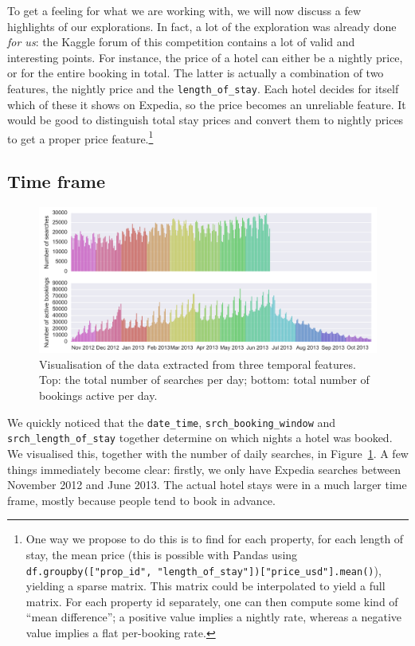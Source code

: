 \documentclass[runningheads,a4paper]{llncs}
\begin{document}
To get a feeling for what we are working with, we will now discuss a few highlights
of our explorations. In fact, a lot of the exploration was already done \emph{for us}: 
the Kaggle forum of this competition contains a lot of valid and interesting points.
For instance, the price of a hotel can either be a nightly price, or for the entire
booking in total. The latter is actually a combination of two features, the nightly price and the \verb|length_of_stay|. Each hotel decides for itself which of these it shows on Expedia, so the price becomes an unreliable feature. It would be good to distinguish total stay prices and convert them to nightly prices to get a proper price feature.\footnote{One way we propose to do this is to find for each property, for each length of stay, the mean price (this is possible with Pandas using \texttt{df.groupby(["prop\_id", "length\_of\_stay"])["price\_usd"].mean()}), yielding a sparse matrix. This matrix could be interpolated to yield a full matrix. For each property id separately, one can then compute some kind of ``mean difference''; a positive value implies a nightly rate, whereas a negative value implies a flat per-booking rate.}

\subsection{Time frame}
\begin{figure}[h]
	\includegraphics[width=\linewidth]{Pictures/dateplot.png}
    \caption{Visualisation of the data extracted from three temporal features. Top: the total number of searches per day; bottom: total number of bookings active per day.}
    \label{fig:dates}
\end{figure}
We quickly noticed that the \verb|date_time|, \verb|srch_booking_window| and 
\verb|srch_length_of_stay| together determine on which nights a hotel was booked.  
We visualised this, together with the number of daily searches, in Figure~\ref{fig:dates}. 
A few things immediately become clear: firstly, we only have Expedia searches between 
November 2012 and June 2013. The actual hotel stays were in a much larger time 
frame, mostly because people tend to book in advance. 
\end{document}
